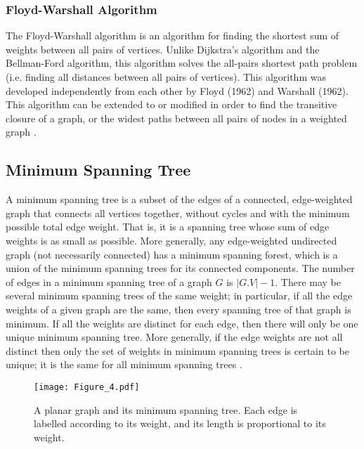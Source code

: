 \documentclass[10pt,11pt,12pt,oneside]{book}
\begin{document}
	\subsubsection{Floyd-Warshall Algorithm}
	The Floyd-Warshall algorithm is an algorithm for finding the shortest sum of weights between all pairs of vertices. Unlike Dijkstra’s algorithm and the Bellman-Ford algorithm, this algorithm solves the all-pairs shortest path problem (i.e. finding all distances between all pairs of vertices). This algorithm was developed independently from each other by Floyd (1962) and Warshall (1962). This algorithm can be extended to or modified in order to find the transitive closure of a graph, or the widest paths between all pairs of nodes in a weighted graph \cite{beel2016paper}. 
	
	\subsection{Minimum Spanning Tree}
	A minimum spanning tree is a subset of the edges of a connected, edge-weighted graph that connects all vertices together, without cycles and with the minimum possible total edge weight. That is, it is a spanning tree whose sum of edge weights is as small as possible. More generally, any edge-weighted undirected graph (not necessarily connected) has a minimum spanning forest, which is a union of the minimum spanning trees for its connected components. The number of edges in a minimum spanning tree of a graph $G$ is $|G.V| - 1$. There may be several minimum spanning trees of the same weight; in particular, if all the edge weights of a given graph are the same, then every spanning tree of that graph is minimum. If all the weights are distinct for each edge, then there will only be one unique minimum spanning tree. More generally, if the edge weights are not all distinct then only the set of weights in minimum spanning trees is certain to be unique; it is the same for all minimum spanning trees \cite{bang2008digraphs}.\\
	
	\begin{figure}[!htb]
		\centering
		\texttt{[image: Figure\_4.pdf]}
		\caption{A planar graph and its minimum spanning tree. Each edge is labelled according to its weight, and its length is proportional to its weight.}
		\label{fig:my_label}
	\end{figure}
	
\end{document}
